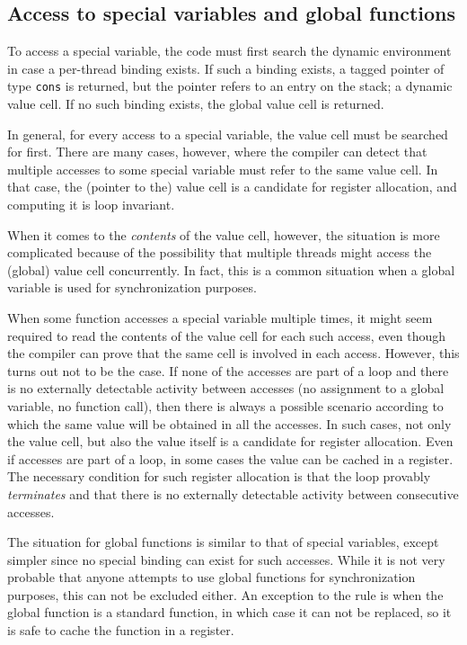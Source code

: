 \subsection{Access to special variables and global functions}

To access a special variable, the code must first search the dynamic
environment in case a per-thread binding exists.  If such a binding
exists, a tagged pointer of type \texttt{cons} is returned, but the
pointer refers to an entry on the stack; a dynamic value cell.  If no
such binding exists, the global value cell is returned.

In general, for every access to a special variable, the value cell
must be searched for first.  There are many cases, however, where the
compiler can detect that multiple accesses to some special variable
must refer to the same value cell.  In that case, the (pointer to the)
value cell is a candidate for register allocation, and computing it is
loop invariant.

When it comes to the \emph{contents} of the value cell, however, the
situation is more complicated because of the possibility that multiple
threads might access the (global) value cell concurrently.  In fact,
this is a common situation when a global variable is used for
synchronization purposes.

When some function accesses a special variable multiple times, it
might seem required to read the contents of the value cell for each
such access, even though the compiler can prove that the same cell is
involved in each access.  However, this turns out not to be the case.
If none of the accesses are part of a loop and there is no externally
detectable activity between accesses (no assignment to a global
variable, no function call), then there is always a possible scenario
according to which the same value will be obtained in all the
accesses.  In such cases, not only the value cell, but also the value
itself is a candidate for register allocation.  Even if accesses are
part of a loop, in some cases the value can be cached in a register.
The necessary condition for such register allocation is that the loop
provably \emph{terminates} and that there is no externally detectable
activity between consecutive accesses.

The situation for global functions is similar to that of special
variables, except simpler since no special binding can exist for such
accesses.  While it is not very probable that anyone attempts to use
global functions for synchronization purposes, this can not be
excluded either.  An exception to the rule is when the global function
is a standard \commonlisp{} function, in which case it can not be replaced, so
it is safe to cache the function in a register.


